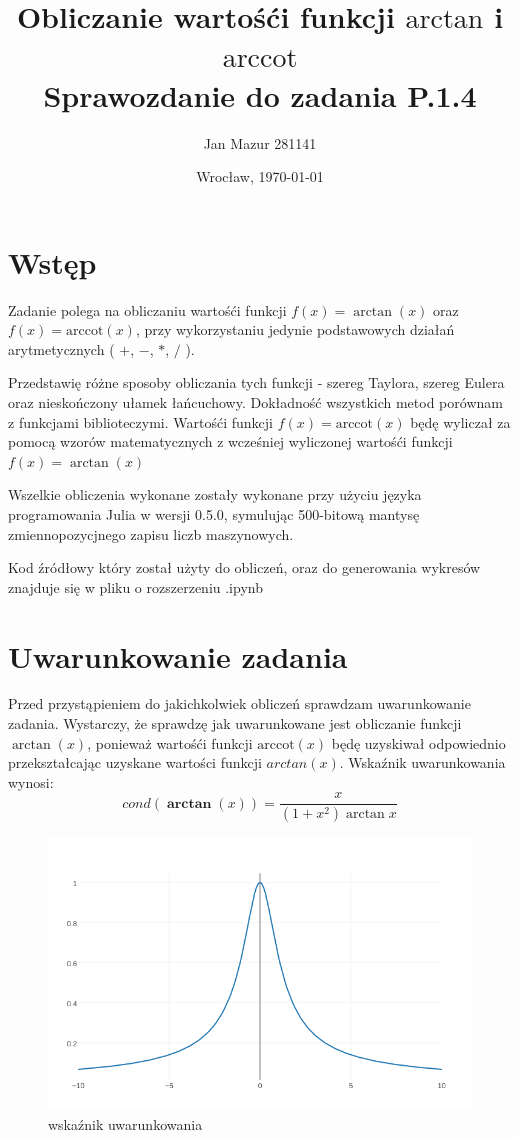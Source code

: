 \documentclass{article}
\author{Jan Mazur 281141}
\date{Wrocław, \today}
\title{\textbf{Obliczanie wartośći funkcji $\textrm{arctan}$ i $\textrm{arccot}$ } \\ Sprawozdanie do zadania P.1.4}
\begin{document}
\maketitle

\section{Wstęp}

Zadanie polega na obliczaniu wartośći funkcji $f(x) = \arctan(x)$ oraz\\ $f(x) = \textrm{arccot}(x)$, przy wykorzystaniu jedynie podstawowych działań arytmetycznych ( $+$, $-$, $*$, $/$ ).

\indent Przedstawię różne sposoby obliczania tych funkcji - szereg Taylora, szereg Eulera oraz nieskończony ułamek łańcuchowy. 
Dokładność wszystkich metod porównam z funkcjami biblioteczymi.
Wartośći funkcji  $f(x) = \textrm{arccot}(x)$ będę wyliczał za pomocą wzorów matematycznych z wcześniej wyliczonej wartośći funkcji $f(x) = \arctan(x)$

\indent Wszelkie obliczenia wykonane zostały wykonane przy użyciu języka programowania Julia w wersji 0.5.0, symulując 500-bitową mantysę zmiennopozycjnego zapisu liczb maszynowych.

\indent Kod źródłowy który został użyty do obliczeń, oraz do generowania wykresów znajduje się w pliku o rozszerzeniu .ipynb

\section{Uwarunkowanie zadania}
Przed przystąpieniem do jakichkolwiek obliczeń sprawdzam uwarunkowanie zadania. Wystarczy, że sprawdzę jak uwarunkowane jest obliczanie funkcji $\arctan(x)$, ponieważ wartośći funkcji $\textrm{arccot}(x)$ będę uzyskiwał odpowiednio przekształcając uzyskane wartości funkcji $arctan(x)$. Wskaźnik uwarunkowania wynosi:
\begin{equation}{\displaystyle cond(\mathbf {\arctan}(x) )}=\frac{x}{\left ( 1+x^{2} \right )\arctan x}\end{equation}

\begin{figure}[t]
	\includegraphics[width=\textwidth,scale=0.5]{cond.png}
	\caption{wskaźnik uwarunkowania}
	\label{wskaźnik uwarunkowania}
\end{figure}
\end{document}
